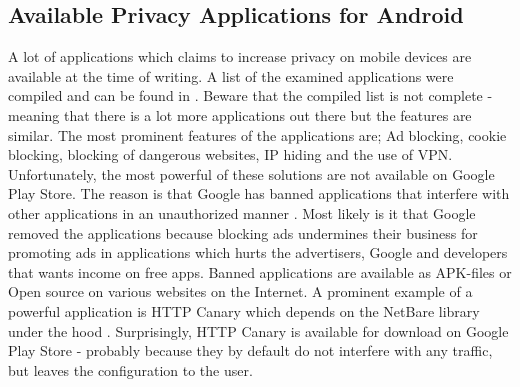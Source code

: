 \documentclass[main.tex]{subfiles}
\begin{document}


\subsection{Available Privacy Applications for Android}
A lot of applications which claims to increase privacy on mobile devices are available at the time of writing. A list of the examined applications were compiled and can be found in . Beware that the compiled list is not complete - meaning that there is a lot more applications out there but the features are similar. The most prominent features of the applications are; Ad blocking, cookie blocking, blocking of dangerous websites, IP hiding and the use of VPN. Unfortunately, the most powerful of these solutions are not available on Google Play Store. The reason is that Google has banned applications that interfere with other applications in an unauthorized manner \cite{WladimirPalantAdblockStore}. Most likely is it that Google removed the applications because blocking ads undermines their business for promoting ads in applications which hurts the advertisers, Google and developers that wants income on free apps. Banned applications are available as APK-files or Open source on various websites on the Internet. A prominent example of a powerful application is HTTP Canary which depends on the NetBare library under the hood \cite{GuoShiHttpCanaryPlay}\cite{MagatronKingMegatronKing/NetBare:Android}. Surprisingly, HTTP Canary is available for download on Google Play Store - probably because they by default do not interfere with any traffic, but leaves the configuration to the user.
\end{document}
